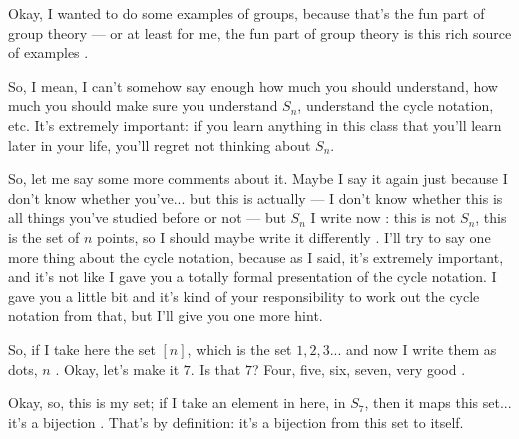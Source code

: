 \begin{speech}[00:27:49 - 00:29:43]
Okay, I wanted to do some examples of groups, because that's the fun part of group theory --- or at least for me, the fun part of group theory is this rich source of examples .

So, I mean, I can't somehow say enough how much you should understand, how much you should make sure you understand $S_n$, understand the cycle notation, etc. It's extremely important: if you learn anything in this class that you'll learn later in your life, you'll regret not thinking about $S_n$.

So, let me say some more comments about it. Maybe I say it again just because I don't know whether you've... but this is actually --- I don't know whether this is all things you've studied before or not --- but $S_n$ I write now : this is not $S_n$, this is the set of $n$ points, so I should maybe write it differently . I'll try to say one more thing about the cycle notation, because as I said, it's extremely important, and it's not like I gave you a totally formal presentation of the cycle notation. I gave you a little bit and it's kind of your responsibility to work out the cycle notation from that, but I'll give you one more hint.

So, if I take here the set $[n]$, which is the set $1, 2, 3$... and now I write them as dots, $n$ . Okay, let's make it $7$. Is that $7$? Four, five, six, seven, very good .

Okay, so, this is my set; if I take an element in here, in $S_7$, then it maps this set... it's a bijection . That's by definition: it's a bijection from this set to itself.
\end{speech}

\begin{content}
\end{content}

